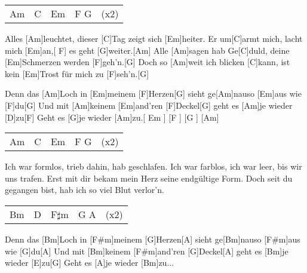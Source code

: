 

\begin{guitar}
	{\footnotesize\begin{tabular}{l|l|l|l|l}
			Am & C & Em & F G & (x2)
	\end{tabular}}
	
	Alles [Am]leuchtet, dieser [C]Tag zeigt sich [Em]heiter.
	Er um[C]armt mich, lacht mich [Em]an,[ F] es geht [G]weiter.[Am]{}
	Alle [Am]sagen hab Ge[C]duld, deine [Em]Schmerzen werden [F]geh'n.[G]{}
	Doch so [Am]weit ich blicken [C]kann, ist kein [Em]Trost für mich zu [F]seh'n.[G]{}
	
	Denn das [Am]Loch in [Em]meinem [F]Herzen[G] sieht ge[Am]nauso [Em]aus wie [F]du[G]{}
	Und mit [Am]keinem [Em]and'ren [F]Deckel[G] geht es [Am]je wieder [D]zu[F]{}
	Geht es [G]je wieder [Am]{zu.}[ Em ] [F ] [G ] [Am]{}
	
	{\footnotesize\begin{tabular}{l|l|l|l|l}
			Am & C & Em & F G & (x2)
	\end{tabular}}
	
	Ich war formlos, trieb dahin, hab geschlafen.
	Ich war farblos, ich war leer, bis wir uns trafen.
	Erst mit dir bekam mein Herz seine endgültige Form.
	Doch seit du gegangen bist, hab ich so viel Blut verlor'n.
	
	 
	
	{\footnotesize\begin{tabular}{l|l|l|l|l}
			Bm & D & F$\sharp$m & G A & (x2)
	\end{tabular}}
	
	Denn das [Bm]Loch in [F#m]meinem [G]Herzen[A] sieht ge[Bm]nauso [F#m]aus wie [G]du[A]{}
	Und mit [Bm]keinem [F#m]and'ren [G]Deckel[A] geht es [Bm]je wieder [E]zu[G]{}
	Geht es [A]je wieder [Bm]zu...
	
\end{guitar}